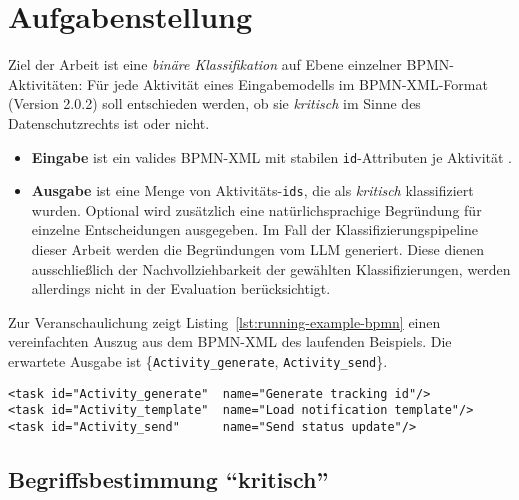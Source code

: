 \section{Aufgabenstellung}\label{sec:aufgabenstellung}

Ziel der Arbeit ist eine \emph{binäre Klassifikation} auf Ebene einzelner \ac{BPMN}-Aktivitäten: Für jede Aktivität eines Eingabemodells im \ac{BPMN}-XML-Format (Version 2.0.2) \cite{omgbpmn} soll entschieden werden, ob sie \emph{kritisch} im Sinne des Datenschutzrechts ist oder nicht.

\begin{itemize}
    \item \textbf{Eingabe} ist ein valides \ac{BPMN}-XML mit stabilen \texttt{id}-Attributen je Aktivität \cite{omgbpmn}.
    \item \textbf{Ausgabe} ist eine Menge von Aktivitäts-\texttt{ids}, die als \emph{kritisch} klassifiziert wurden. Optional wird zusätzlich eine natürlichsprachige Begründung für einzelne Entscheidungen ausgegeben. Im Fall der Klassifizierungspipeline dieser Arbeit werden die Begründungen vom \ac{LLM} generiert. Diese dienen ausschließlich der Nachvollziehbarkeit der gewählten Klassifizierungen, werden allerdings nicht in der Evaluation berücksichtigt.
\end{itemize}

Zur Veranschaulichung zeigt Listing~\ref{lst:running-example-bpmn} einen vereinfachten  Auszug aus dem \ac{BPMN}-XML des laufenden Beispiels. Die erwartete Ausgabe ist \{\texttt{Activity\_generate}, \texttt{Activity\_send}\}.

\begin{lstlisting}[caption={BPMN-XML-Auszug des laufenden Beispiels}, label={lst:running-example-bpmn}]
<task id="Activity_generate"  name="Generate tracking id"/>
<task id="Activity_template"  name="Load notification template"/>
<task id="Activity_send"      name="Send status update"/>
\end{lstlisting}

\subsection*{Begriffsbestimmung \enquote{kritisch}}

